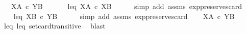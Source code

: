 \begin{isabellebody}
\ \ \ {\isachardoublequoteopen}X\isactrlbsup A\isactrlesup \ {\isasymle}\isactrlsub c\ Y\isactrlbsup B\isactrlesup {\isachardoublequoteclose}\isanewline
%
\isadelimproof
%
\endisadelimproof
%
\isatagproof
{}\isamarkupfalse%
\ {\isacharminus}{\kern0pt}\ \isanewline
\ \ \isamarkupfalse%
\ leq{}{\isacharcolon}{\kern0pt}\ {\isachardoublequoteopen}X\isactrlbsup A\isactrlesup \ {\isasymle}\isactrlsub c\ X\isactrlbsup B\isactrlesup {\isachardoublequoteclose}\isanewline
\ \ \ \ \isamarkupfalse%
\ {\isacharparenleft}{\kern0pt}simp\ add{\isacharcolon}{\kern0pt}\ assms{\isacharparenleft}{\kern0pt}{}{\isacharcomma}{\kern0pt}{}{\isacharparenright}{\kern0pt}\ exp{\isacharunderscore}{\kern0pt}preserves{\isacharunderscore}{\kern0pt}card{}{\isacharparenright}{\kern0pt}\ \ \ \ \isanewline
\ \ \isamarkupfalse%
\ leq{}{\isacharcolon}{\kern0pt}\ {\isachardoublequoteopen}X\isactrlbsup B\isactrlesup \ {\isasymle}\isactrlsub c\ Y\isactrlbsup B\isactrlesup {\isachardoublequoteclose}\isanewline
\ \ \ \ \isamarkupfalse%
\ {\isacharparenleft}{\kern0pt}simp\ add{\isacharcolon}{\kern0pt}\ assms{\isacharparenleft}{\kern0pt}{}{\isacharparenright}{\kern0pt}\ exp{\isacharunderscore}{\kern0pt}preserves{\isacharunderscore}{\kern0pt}card{}{\isacharparenright}{\kern0pt}\isanewline
\ \ \isamarkupfalse%
\ {\isachardoublequoteopen}X\isactrlbsup A\isactrlesup \ {\isasymle}\isactrlsub c\ Y\isactrlbsup B\isactrlesup {\isachardoublequoteclose}\isanewline
\ \ \ \ \isamarkupfalse%
\ leq{}\ leq{}\ set{\isacharunderscore}{\kern0pt}card{\isacharunderscore}{\kern0pt}transitive\ \isamarkupfalse%
\ blast\isanewline
{}\isamarkupfalse%
%
\endisatagproof
{\isafoldproof}%
%
\isadelimproof
\isanewline
%
\endisadelimproof
%
\isadelimtheory
\isanewline
%
\endisadelimtheory
%
\isatagtheory
{}\isamarkupfalse%
%
\endisatagtheory
{\isafoldtheory}%
%
\isadelimtheory
%
\endisadelimtheory
%
\end{isabellebody}%
\endinput
